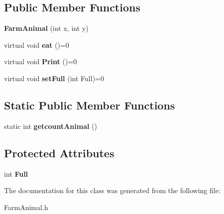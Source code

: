 \subsection*{Public Member Functions}
\begin{DoxyCompactItemize}
\item 
\mbox{\label{classFarmAnimal_adea13b232d5f3967a473e2e062d33ee8}} 
{\bfseries Farm\+Animal} (int x, int y)
\item 
\mbox{\label{classFarmAnimal_ae458bb1da5c7ac4133520f8a4d53dbe0}} 
virtual void {\bfseries eat} ()=0
\item 
\mbox{\label{classFarmAnimal_a6e60fd2db37d4c521d9905310754ab85}} 
virtual void {\bfseries Print} ()=0
\item 
\mbox{\label{classFarmAnimal_a3a741d8636f20916bef977111e8e1657}} 
virtual void {\bfseries set\+Full} (int Full)=0
\end{DoxyCompactItemize}
\subsection*{Static Public Member Functions}
\begin{DoxyCompactItemize}
\item 
\mbox{\label{classFarmAnimal_aa42aa4fdeea6a98756cd0a4b58938291}} 
static int {\bfseries getcount\+Animal} ()
\end{DoxyCompactItemize}
\subsection*{Protected Attributes}
\begin{DoxyCompactItemize}
\item 
\mbox{\label{classFarmAnimal_a05002cb10f4fcc02f6723a6a118e65b4}} 
int {\bfseries Full}
\end{DoxyCompactItemize}


The documentation for this class was generated from the following file\+:\begin{DoxyCompactItemize}
\item 
Farm\+Animal.\+h\end{DoxyCompactItemize}
